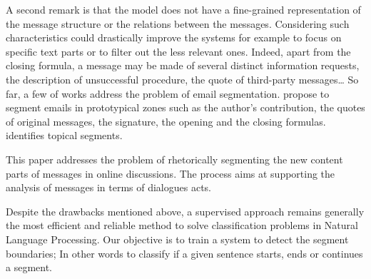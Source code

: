 A second remark is that the model does not have a fine-grained representation of the message structure or the relations between the messages. Considering such characteristics could drastically improve the systems for example to focus on specific text parts or to filter out the less relevant ones. 
Indeed, apart from the closing formula, a message may be made of several distinct information requests, the description of unsuccessful procedure, the quote of third-party messages\ldots
So far, a few of works address the problem of email segmentation.
\cite{lampert:2009:emnlp} propose to segment emails in prototypical zones such as the author's contribution, the quotes of original messages, the signature, the opening and the closing formulas. 
\cite{joty:2013:jair} identifies topical segments. 

This paper addresses the problem of rhetorically segmenting the new content parts of messages in online discussions. The process aims at supporting the analysis of messages in terms of dialogues acts.

Despite the drawbacks mentioned above, a supervised approach remains generally the most efficient and reliable method to solve classification problems in Natural Language Processing. 
% 
Our objective is to train a system to detect the segment boundaries; In other words to classify if a given sentence starts, ends or continues a segment.

